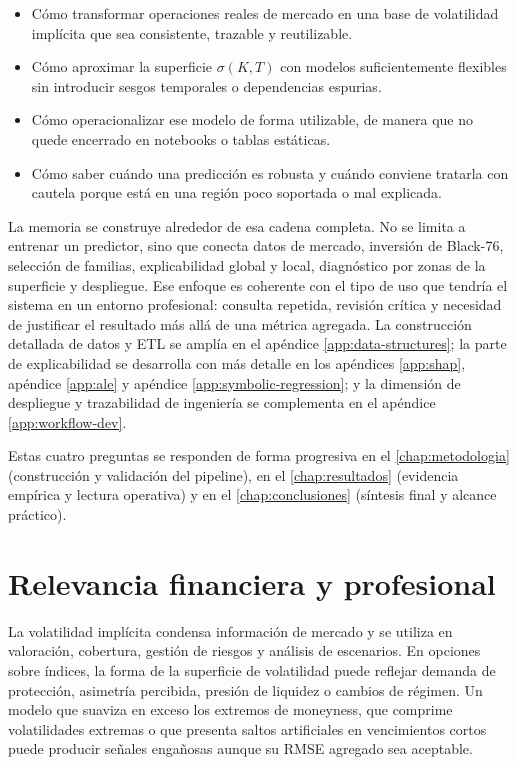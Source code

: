 \begin{itemize}
  \item Cómo transformar operaciones reales de mercado en una base de volatilidad implícita que sea consistente, trazable y reutilizable.
  \item Cómo aproximar la superficie \(\sigma(K,T)\) con modelos suficientemente flexibles sin introducir sesgos temporales o dependencias espurias.
  \item Cómo operacionalizar ese modelo de forma utilizable, de manera que no quede encerrado en notebooks o tablas estáticas.
  \item Cómo saber cuándo una predicción es robusta y cuándo conviene tratarla con cautela porque está en una región poco soportada o mal explicada.
\end{itemize}

La memoria se construye alrededor de esa cadena completa. No se limita a entrenar un predictor, sino que conecta datos de mercado, inversión de Black-76, selección de familias, explicabilidad global y local, diagnóstico por zonas de la superficie y despliegue. Ese enfoque es coherente con el tipo de uso que tendría el sistema en un entorno profesional: consulta repetida, revisión crítica y necesidad de justificar el resultado más allá de una métrica agregada. La construcción detallada de datos y ETL se amplía en el apéndice \ref{app:data-structures}; la parte de explicabilidad se desarrolla con más detalle en los apéndices \ref{app:shap}, apéndice \ref{app:ale} y apéndice \ref{app:symbolic-regression}; y la dimensión de despliegue y trazabilidad de ingeniería se complementa en el apéndice \ref{app:workflow-dev}.

Estas cuatro preguntas se responden de forma progresiva en el \autoref{chap:metodologia} (construcción y validación del pipeline), en el \autoref{chap:resultados} (evidencia empírica y lectura operativa) y en el \autoref{chap:conclusiones} (síntesis final y alcance práctico).

\section{Relevancia financiera y profesional}
\label{sec:relevancia}

La volatilidad implícita condensa información de mercado y se utiliza en valoración, cobertura, gestión de riesgos y análisis de escenarios. En opciones sobre índices, la forma de la superficie de volatilidad puede reflejar demanda de protección, asimetría percibida, presión de liquidez o cambios de régimen. Un modelo que suaviza en exceso los extremos de moneyness, que comprime volatilidades extremas o que presenta saltos artificiales en vencimientos cortos puede producir señales engañosas aunque su RMSE agregado sea aceptable.

